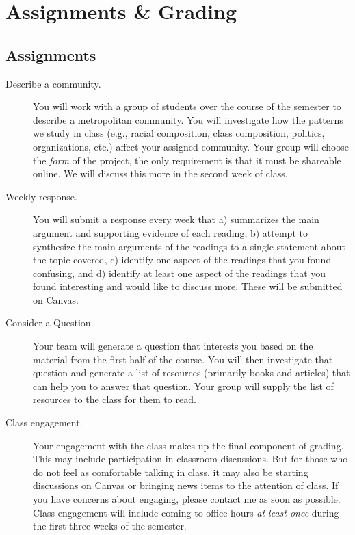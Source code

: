 \documentclass[11pt]{syllabus}
\begin{document}


\section{Assignments \& Grading}
\subsection{Assignments}
\begin{description}
\item[Describe a community.] You will work with a group of students over the course of the semester to describe a metropolitan community. You will investigate how the patterns we study in class (e.g., racial composition, class composition, politics, organizations, etc.) affect your assigned community. Your group will choose the \emph{form} of the project, the only requirement is that it must be shareable online. We will discuss this more in the second week of class. 

\item[Weekly response.] You will submit a response every week that a) summarizes the main argument and supporting evidence of each reading, b) attempt to synthesize the main arguments of the readings to a single statement about the topic covered, c) identify one aspect of the readings that you found confusing, and d) identify at least one aspect of the readings that you found interesting and would like to discuss more. These will be submitted on Canvas.

\item[Consider a Question.] Your team will generate a question that interests you based on the material from the first half of the course. You will then investigate that question and generate a list of resources (primarily books and articles) that can help you to answer that question. Your group will supply the list of resources to the class for them to read. 

\item[Class engagement.] Your engagement with the class makes up the final component of grading. This may include participation in classroom discussions. But for those who do not feel as comfortable talking in class, it may also be starting discussions on Canvas or bringing news items to the attention of class. If you have concerns about engaging, please contact me as soon as possible. Class engagement will include coming to office hours \emph{at least once} during the first three weeks of the semester. 

\end{description}
\end{document}
